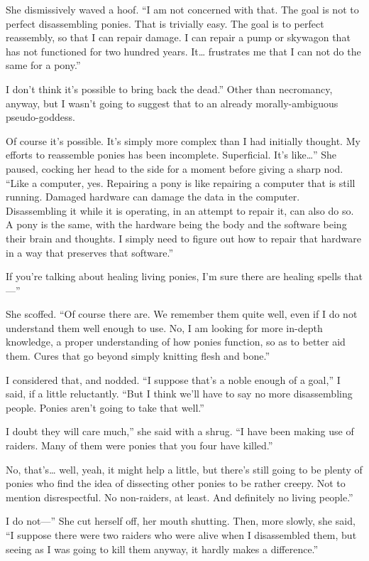 She dismissively waved a hoof. “I am not concerned with that. The goal is not to perfect disassembling ponies. That is trivially easy. The goal is to perfect reassembly, so that I can repair damage. I can repair a pump or skywagon that has not functioned for two hundred years. It… frustrates me that I can not do the same for a pony.”

\leavevmode{}I don’t think it’s possible to bring back the dead.” Other than necromancy, anyway, but I wasn’t going to suggest that to an already morally-ambiguous pseudo-goddess.

\leavevmode{}Of course it’s possible. It’s simply more complex than I had initially thought. My efforts to reassemble ponies has been incomplete. Superficial. It’s like…” She paused, cocking her head to the side for a moment before giving a sharp nod. “Like a computer, yes. Repairing a pony is like repairing a computer that is still running. Damaged hardware can damage the data in the computer. Disassembling it while it is operating, in an attempt to repair it, can also do so. A pony is the same, with the hardware being the body and the software being their brain and thoughts. I simply need to figure out how to repair that hardware in a way that preserves that software.”

\leavevmode{}If you’re talking about healing living ponies, I’m sure there are healing spells that—”

She scoffed. “Of course there are. We remember them quite well, even if I do not understand them well enough to use. No, I am looking for more in-depth knowledge, a proper understanding of how ponies function, so as to better aid them. Cures that go beyond simply knitting flesh and bone.”

I considered that, and nodded. “I suppose that’s a noble enough of a goal,” I said, if a little reluctantly. “But I think we’ll have to say no more disassembling people. Ponies aren’t going to take that well.”

\leavevmode{}I doubt they will care much,” she said with a shrug. “I have been making use of raiders. Many of them were ponies that you four have killed.”

\leavevmode{}No, that’s… well, yeah, it might help a little, but there’s still going to be plenty of ponies who find the idea of dissecting other ponies to be rather creepy. Not to mention disrespectful. No non-raiders, at least. And definitely no living people.”

\leavevmode{}I do not—” She cut herself off, her mouth shutting. Then, more slowly, she said, “I suppose there were two raiders who were alive when I disassembled them, but seeing as I was going to kill them anyway, it hardly makes a difference.”

